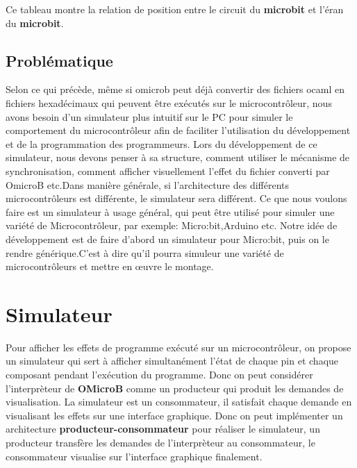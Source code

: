 \documentclass[14px]{article}
\begin{document}
Ce tableau montre la relation de position entre le circuit du  \textbf{microbit} et l'éran du \textbf{microbit}.

\begin{figure}

\end{figure}

\clearpage
\subsection{Problématique}
Selon ce qui précède, même si omicrob peut déjà convertir des fichiers ocaml en fichiers hexadécimaux qui peuvent être exécutés sur le microcontrôleur, nous avons besoin d'un simulateur plus intuitif sur le PC pour simuler le comportement du microcontrôleur afin de faciliter l'utilisation du développement et de la programmation des programmeurs. Lors du développement de ce simulateur, nous devons penser à sa structure, comment utiliser le mécanisme de synchronisation, comment afficher visuellement l'effet du fichier converti par OmicroB etc.Dans manière générale, si l'architecture des différents microcontrôleurs est différente, le simulateur sera différent. Ce que nous voulons faire est un simulateur à usage général, qui peut être utilisé pour simuler une variété de Microcontrôleur, par exemple: Micro:bit,Arduino etc. Notre idée de développement est de faire d'abord un simulateur pour Micro:bit, puis on le rendre générique.C'est à dire qu'il pourra simuleur une variété de microcontrôleurs et mettre en œuvre le montage.

\clearpage
\pagestyle{fancy}
\rhead{\thepage}
\fancyfoot{}
\section{Simulateur}
Pour afficher les effets de programme exécuté sur un microcontrôleur, on propose un simulateur qui sert à afficher simultanément l'état de chaque pin et chaque composant pendant l'exécution du programme. Donc on peut considérer l'interprèteur de \textbf{OMicroB} comme un producteur qui produit les demandes de visualisation. La simulateur est un consommateur, il satisfait chaque demande en visualisant les effets sur une interface graphique. Donc on peut implémenter un architecture \textbf{producteur-consommateur} pour réaliser le simulateur, un producteur transfère les demandes de l'interprèteur au consommateur, le consommateur visualise sur l'interface graphique finalement.\\
\end{document}
